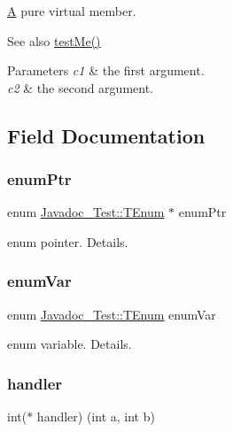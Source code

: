 \hyperlink{class_a}{A} pure virtual member. \begin{DoxySeeAlso}{See also}
\hyperlink{class_javadoc___test_af1299ea1b7efeb1548c7aba201ebe756}{test\+Me()} 
\end{DoxySeeAlso}

\begin{DoxyParams}{Parameters}
{\em c1} & the first argument. \\
\hline
{\em c2} & the second argument. \\
\hline
\end{DoxyParams}


\subsection{Field Documentation}
\mbox{\label{class_javadoc___test_ab994283d87e01a8bbe197a9c8eac7c06}} 
\subsubsection{\texorpdfstring{enum\+Ptr}{enumPtr}}
{\footnotesize\ttfamily enum \hyperlink{class_javadoc___test_a33e3643b66dfa91e4fb7cc663a23e166}{Javadoc\+\_\+\+Test\+::\+T\+Enum} 
       $\ast$ enum\+Ptr}

enum pointer. Details. \mbox{\label{class_javadoc___test_a1e1e81400c78c4a5992888bd484d9d68}} 
\subsubsection{\texorpdfstring{enum\+Var}{enumVar}}
{\footnotesize\ttfamily enum \hyperlink{class_javadoc___test_a33e3643b66dfa91e4fb7cc663a23e166}{Javadoc\+\_\+\+Test\+::\+T\+Enum}
        enum\+Var}

enum variable. Details. \mbox{\label{class_javadoc___test_a83e6d7b763dc413e96b0c435a1d29a5d}} 
\subsubsection{\texorpdfstring{handler}{handler}}
{\footnotesize\ttfamily int($\ast$ handler) (int a, int b)}

